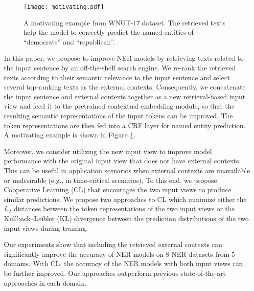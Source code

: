 \documentclass[11pt,a4paper]{article}
\begin{document}
\begin{figure}[t]
	\centering
	\texttt{[image: motivating.pdf]}
	\caption{A motivating example from WNUT-17 dataset. The retrieved texts help the model to correctly predict the named entities of ``democrats'' and ``republican''.}
	\label{fig:motivate}
\end{figure}

In this paper, we propose to improve NER models by retrieving texts related to the input sentence by an off-the-shelf search engine. We re-rank the retrieved texts according to their semantic relevance to the input sentence and select several top-ranking texts as the external contexts. Consequently, we concatenate the input sentence and external contexts together as a new retrieval-based input view and feed it to the pretrained contextual embedding module, so that the resulting semantic representations of the input tokens can be improved. The token representations are then fed into a CRF layer for named entity prediction. A motivating example is shown in Figure \ref{fig:motivate}.

Moreover, we consider utilizing the new input view to improve model performance with the original input view that does not have external contexts. This can be useful in application scenarios when external contexts are unavailable or undesirable (e.g., in time-critical scenarios). To this end, we propose Cooperative Learning (CL) that encourages the two input views to produce similar predictions. We propose two approaches to CL which minimize either the $L_2$ distances between the token representations of the two input views or the Kullback–Leibler (KL) divergence between the prediction distributions of the two input views during training. 

Our experiments show that including the retrieved external contexts can significantly improve the accuracy of NER models on 8 NER datasets from 5 domains. With CL, the accuracy of the NER models with both input views can be further improved. Our approaches outperform previous state-of-the-art approaches in each domain. 
\end{document}
